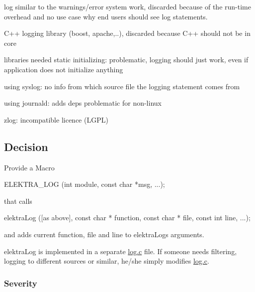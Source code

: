 \begin{DoxyItemize}
\item log similar to the warnings/error system work, discarded because of the run-\/time overhead and no use case why end users should see log statements.
\item C++ logging library (boost, apache,..), discarded because C++ should not be in core
\item libraries needed static initializing\+: problematic, logging should just work, even if application does not initialize anything
\item using syslog\+: no info from which source file the logging statement comes from
\item using journald\+: adds deps problematic for non-\/linux
\item zlog\+: incompatible licence (L\+G\+PL)
\end{DoxyItemize}

\subsection*{Decision}

Provide a Macro


\begin{DoxyCode}
ELEKTRA\_LOG (\textcolor{keywordtype}{int} module, \textcolor{keyword}{const} \textcolor{keywordtype}{char} *msg, ...);
\end{DoxyCode}


that calls


\begin{DoxyCode}
elektraLog ([as above], \textcolor{keyword}{const} \textcolor{keywordtype}{char} * \textcolor{keyword}{function}, \textcolor{keyword}{const} \textcolor{keywordtype}{char} * file,
            \textcolor{keyword}{const} \textcolor{keywordtype}{int} line, ...);
\end{DoxyCode}


and adds current function, file and line to {\ttfamily elektra\+Log}\textquotesingle{}s arguments.

{\ttfamily elektra\+Log} is implemented in a separate {\ttfamily \hyperlink{log_8c}{log.\+c}} file. If someone needs filtering, logging to different sources or similar, he/she simply modifies {\ttfamily \hyperlink{log_8c}{log.\+c}}.

\subsubsection*{Severity}

